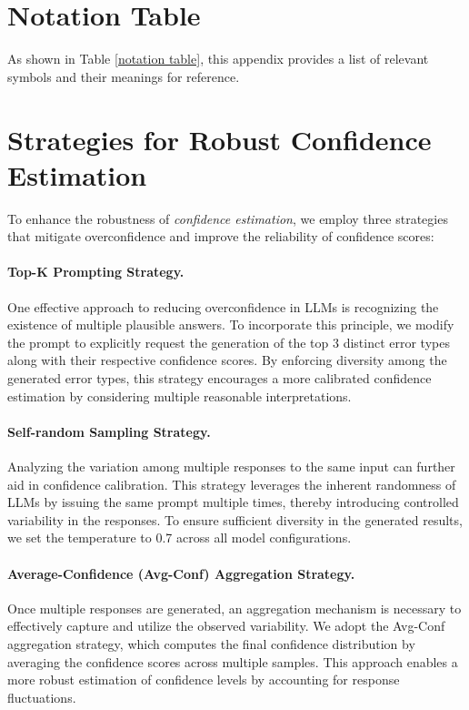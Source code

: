 \section{Notation Table}
\label{appendix notation table}

As shown in Table \ref{notation table}, this appendix provides a list of relevant symbols and their meanings for reference.

\section{Strategies for Robust Confidence Estimation}
\label{appendix confidence}
To enhance the robustness of \textit{confidence estimation}, we employ three strategies \citep{confidence} that mitigate overconfidence and improve the reliability of confidence scores:

\paragraph{Top-K Prompting Strategy.} One effective approach to reducing overconfidence in LLMs is recognizing the existence of multiple plausible answers. To incorporate this principle, we modify the prompt to explicitly request the generation of the top 3 distinct error types along with their respective confidence scores. By enforcing diversity among the generated error types, this strategy encourages a more calibrated confidence estimation by considering multiple reasonable interpretations.

\paragraph{Self-random Sampling Strategy.} Analyzing the variation among multiple responses to the same input can further aid in confidence calibration. This strategy leverages the inherent randomness of LLMs by issuing the same prompt multiple times, thereby introducing controlled variability in the responses. To ensure sufficient diversity in the generated results, we set the temperature to 0.7 across all model configurations.

\paragraph{Average-Confidence (Avg-Conf) Aggregation Strategy.} Once multiple responses are generated, an aggregation mechanism is necessary to effectively capture and utilize the observed variability. We adopt the Avg-Conf aggregation strategy, which computes the final confidence distribution by averaging the confidence scores across multiple samples. This approach enables a more robust estimation of confidence levels by accounting for response fluctuations.

